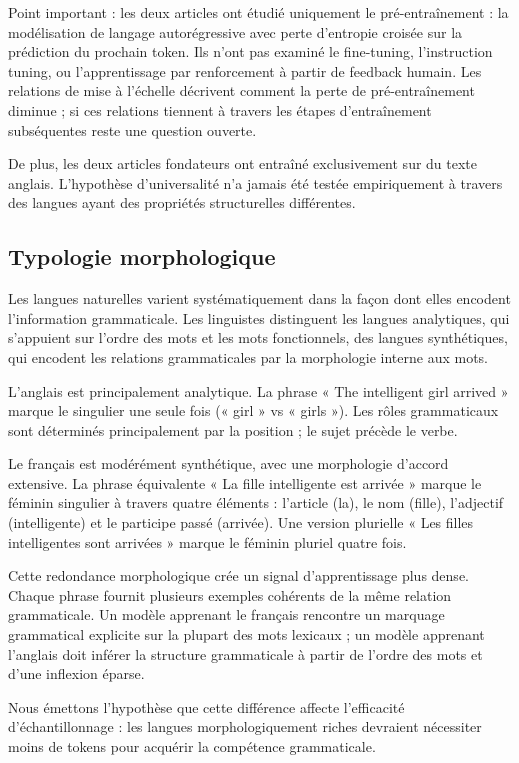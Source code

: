 \documentclass[11pt,a4paper]{article}
\begin{document}
Point important : les deux articles ont étudié uniquement le pré-entraînement : la modélisation de langage autorégressive avec perte d'entropie croisée sur la prédiction du prochain token. Ils n'ont pas examiné le fine-tuning, l'instruction tuning, ou l'apprentissage par renforcement à partir de feedback humain. Les relations de mise à l'échelle décrivent comment la perte de pré-entraînement diminue ; si ces relations tiennent à travers les étapes d'entraînement subséquentes reste une question ouverte.

De plus, les deux articles fondateurs ont entraîné exclusivement sur du texte anglais. L'hypothèse d'universalité n'a jamais été testée empiriquement à travers des langues ayant des propriétés structurelles différentes.

\subsection{Typologie morphologique}

Les langues naturelles varient systématiquement dans la façon dont elles encodent l'information grammaticale. Les linguistes distinguent les langues analytiques, qui s'appuient sur l'ordre des mots et les mots fonctionnels, des langues synthétiques, qui encodent les relations grammaticales par la morphologie interne aux mots.

L'anglais est principalement analytique. La phrase « The intelligent girl arrived » marque le singulier une seule fois (« girl » vs « girls »). Les rôles grammaticaux sont déterminés principalement par la position ; le sujet précède le verbe.

Le français est modérément synthétique, avec une morphologie d'accord extensive. La phrase équivalente « La fille intelligente est arrivée » marque le féminin singulier à travers quatre éléments : l'article (la), le nom (fille), l'adjectif (intelligente) et le participe passé (arrivée). Une version plurielle « Les filles intelligentes sont arrivées » marque le féminin pluriel quatre fois.

Cette redondance morphologique crée un signal d'apprentissage plus dense. Chaque phrase fournit plusieurs exemples cohérents de la même relation grammaticale. Un modèle apprenant le français rencontre un marquage grammatical explicite sur la plupart des mots lexicaux ; un modèle apprenant l'anglais doit inférer la structure grammaticale à partir de l'ordre des mots et d'une inflexion éparse.

Nous émettons l'hypothèse que cette différence affecte l'efficacité d'échantillonnage : les langues morphologiquement riches devraient nécessiter moins de tokens pour acquérir la compétence grammaticale.
\end{document}
